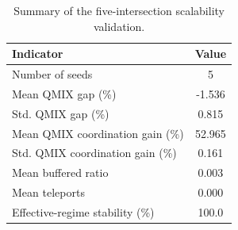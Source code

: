 \begin{table}[htbp]
\centering
\caption{Summary of the five-intersection scalability validation.}
\label{tab:n5_scalability_summary}
\begin{tabular}{lc}
\hline
Indicator & Value \\
\hline
Number of seeds & 5 \\
Mean QMIX gap (\%) & -1.536 \\
Std. QMIX gap (\%) & 0.815 \\
Mean QMIX coordination gain (\%) & 52.965 \\
Std. QMIX coordination gain (\%) & 0.161 \\
Mean buffered ratio & 0.003 \\
Mean teleports & 0.000 \\
Effective-regime stability (\%) & 100.0 \\
\hline
\end{tabular}
\end{table}
